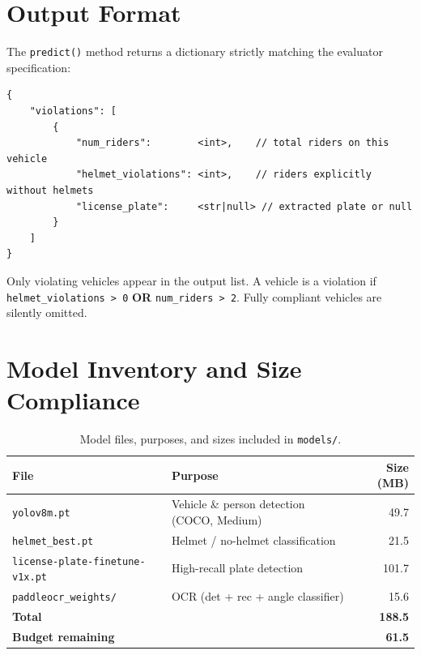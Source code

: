 \documentclass[12pt,a4paper]{article}
\begin{document}
\section{Output Format}

The \texttt{predict()} method returns a dictionary strictly matching the evaluator
specification:

\begin{lstlisting}[style=json, caption={Specification-compliant output format.}]
{
    "violations": [
        {
            "num_riders":        <int>,    // total riders on this vehicle
            "helmet_violations": <int>,    // riders explicitly without helmets
            "license_plate":     <str|null> // extracted plate or null
        }
    ]
}
\end{lstlisting}

Only violating vehicles appear in the output list. A vehicle is a violation if
\texttt{helmet\_violations > 0} \textbf{OR} \texttt{num\_riders > 2}. Fully compliant
vehicles are silently omitted.

\section{Model Inventory and Size Compliance}

\begin{table}[h]
\centering
\caption{Model files, purposes, and sizes included in \texttt{models/}.}
\label{tab:models}
\begin{tabular}{llr}
\toprule
\textbf{File} & \textbf{Purpose} & \textbf{Size (MB)} \\
\midrule
\texttt{yolov8m.pt}                    & Vehicle \& person detection (COCO, Medium)   & 49.7 \\
\texttt{helmet\_best.pt}               & Helmet / no-helmet classification    & 21.5 \\
\texttt{license-plate-finetune-v1x.pt} & High-recall plate detection          & 101.7 \\
\texttt{paddleocr\_weights/}           & OCR (det + rec + angle classifier)   & 15.6 \\
\midrule
\textbf{Total}                         &                                      & \textbf{188.5} \\
\textbf{Budget remaining}              &                                      & \textbf{61.5} \\
\bottomrule
\end{tabular}
\end{table}
\end{document}
